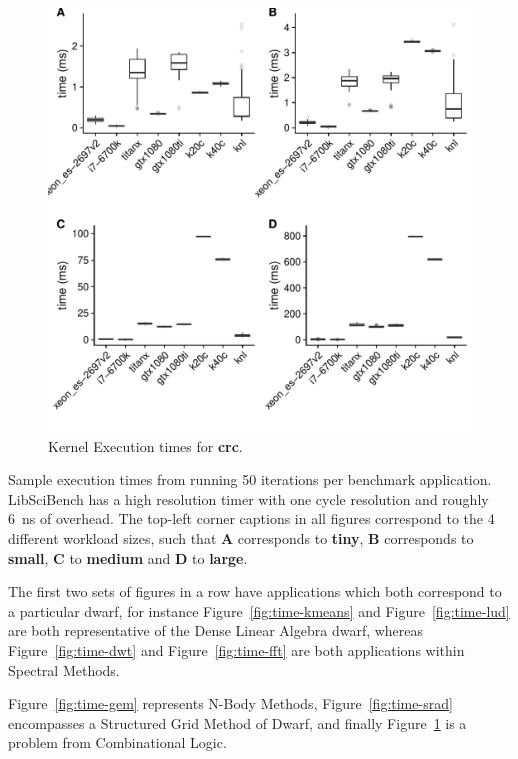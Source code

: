 \documentclass[../document.tex]{subfiles}
\begin{document}
\begin{figure}
\centering
\includegraphics[width=1\textwidth]{figures/time-results/crc.pdf}
\caption{Kernel Execution times for {\bf crc}.}
\label{fig:time-crc}
\end{figure}

Sample execution times from running 50 iterations per benchmark application.
LibSciBench has a high resolution timer with one cycle resolution and roughly \SI{6}{\nano\second} of overhead.
The top-left corner captions in all figures correspond to the 4 different workload sizes, such that {\bf A} corresponds to {\bf tiny}, {\bf B} corresponds to {\bf small}, {\bf C} to {\bf medium} and {\bf D} to {\bf large}.

The first two sets of figures in a row have applications which both correspond to a particular dwarf, for instance Figure~\ref{fig:time-kmeans} and Figure~\ref{fig:time-lud} are both representative of the Dense Linear Algebra dwarf, whereas Figure~\ref{fig:time-dwt} and Figure~\ref{fig:time-fft} are both applications within Spectral Methods.

Figure~\ref{fig:time-gem} represents N-Body Methods, Figure~\ref{fig:time-srad} encompasses a Structured Grid Method of Dwarf, and finally Figure~\ref{fig:time-crc} is a problem from Combinational Logic.

\end{document}

